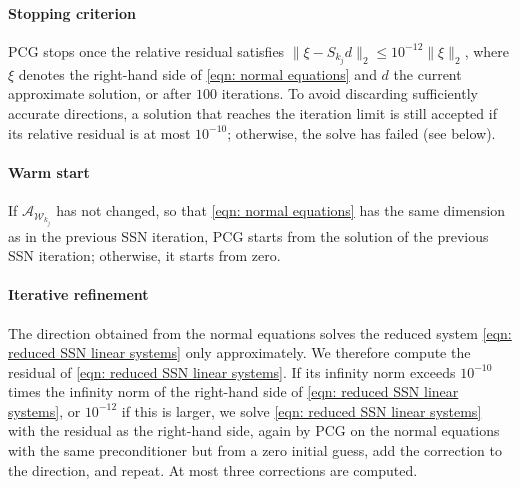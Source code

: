 \paragraph{Stopping criterion} PCG stops once the relative residual satisfies $\|\xi - S_{k_j} d\|_2 \le 10^{-12} \|\xi\|_2$, where $\xi$ denotes the right-hand side of \eqref{eqn: normal equations} and $d$ the current approximate solution, or after $100$ iterations. To avoid discarding sufficiently accurate directions, a solution that reaches the iteration limit is still accepted if its relative residual is at most $10^{-10}$; otherwise, the solve has failed (see below).

\paragraph{Warm start} If $\mathcal{A}_{\mathcal{W}_{k_j}}$ has not changed, so that \eqref{eqn: normal equations} has the same dimension as in the previous SSN iteration, PCG starts from the solution of the previous SSN iteration; otherwise, it starts from zero.

\paragraph{Iterative refinement} The direction obtained from the normal equations solves the reduced system \eqref{eqn: reduced SSN linear systems} only approximately. We therefore compute the residual of \eqref{eqn: reduced SSN linear systems}. If its infinity norm exceeds $10^{-10}$ times the infinity norm of the right-hand side of \eqref{eqn: reduced SSN linear systems}, or $10^{-12}$ if this is larger, we solve \eqref{eqn: reduced SSN linear systems} with the residual as the right-hand side, again by PCG on the normal equations with the same preconditioner but from a zero initial guess, add the correction to the direction, and repeat. At most three corrections are computed.

